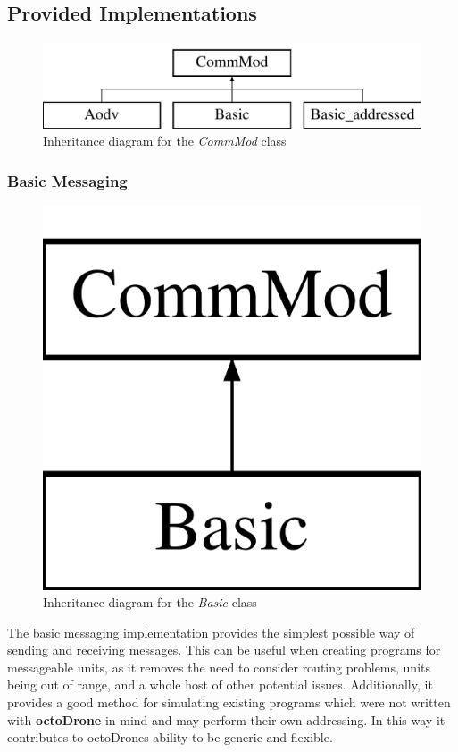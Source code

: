\subsection{Provided Implementations}
\begin{figure}[H]
\centering
\includegraphics[width=\textwidth]{../documentation/latex/class_comm_mod}	
\caption{Inheritance diagram for the \textit{CommMod} class}
\end{figure}

\subsubsection{Basic Messaging}
\begin{figure}[H]
\centering
\includegraphics[scale=0.2]{../documentation/latex/class_basic}	
\caption{Inheritance diagram for the \textit{Basic} class}
\end{figure}

The basic messaging implementation provides the simplest possible way of sending and receiving messages. This can be useful when creating programs for messageable units, as it removes the need to consider routing problems, units being out of range, and a whole host of other potential issues. Additionally, it provides a good method for simulating existing programs which were not written with \textbf{octoDrone} in mind and may perform their own addressing. In this way it contributes to octoDrones ability to be generic and flexible. 

